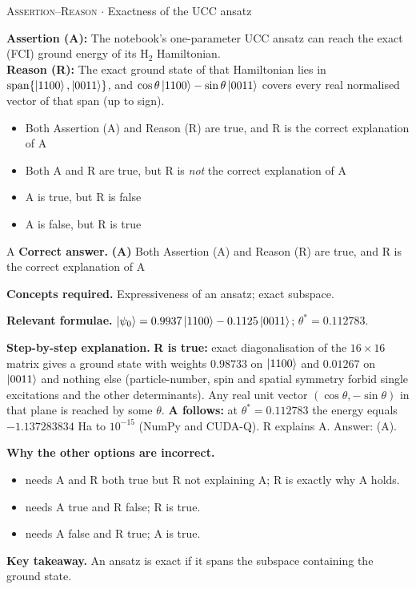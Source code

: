 \documentclass[11pt,a4paper]{article}
\newcommand{\optlabel}[1]{\textbf{(#1)}}
\newcommand{\correctlabel}[1]{\textcolor{okgreen}{\textbf{(#1)}\,\ding{51}}}
\newenvironment{qitem}[1]{\begin{list}{}{\setlength{\leftmargin}{3.3em}\setlength{\labelwidth}{3.1em}%
  \setlength{\labelsep}{0.2em}\setlength{\topsep}{3pt}\setlength{\parsep}{3pt}}\item[\textbf{Q.#1}\hfill]}{\end{list}}
\newcommand{\qsep}{\par\vspace{2pt}{\color{black!15}\hrule}\vspace{4pt}}
\newcommand{\qmeta}[2]{{\footnotesize\color{black!60}\textsc{#1} \;$\cdot$\; #2}\par}
\begin{document}
\begin{qitem}{49}
\qmeta{Assertion--Reason}{Exactness of the UCC ansatz}
\textbf{Assertion (A):} The notebook's one-parameter UCC ansatz can reach the exact (FCI) ground energy of its H$_2$ Hamiltonian.\\[1mm]
\textbf{Reason (R):} The exact ground state of that Hamiltonian lies in $\mathrm{span}\{\ket{1100}, \ket{0011}\}$, and $\cos\theta\ket{1100} - \sin\theta\ket{0011}$ covers every
real normalised vector of that span (up to sign).
\begin{itemize}[leftmargin=2.6em, labelsep=0.4em, itemsep=2pt, topsep=3pt]
\item[\correctlabel{A}] Both Assertion (A) and Reason (R) are true, and R is the correct explanation of A
\item[\optlabel{B}] Both A and R are true, but R is \emph{not} the correct explanation of A
\item[\optlabel{C}] A is true, but R is false
\item[\optlabel{D}] A is false, but R is true
\end{itemize}
\end{qitem}
\begin{solbox}{A}
\textbf{\color{brand}Correct answer.} \textcolor{okgreen}{\textbf{(A)}} Both Assertion (A) and Reason (R) are true, and R is the correct explanation of A

\textbf{\color{brand}Concepts required.} Expressiveness of an ansatz; exact subspace.

\textbf{\color{brand}Relevant formulae.} $\ket{\psi_0} = 0.9937\ket{1100} - 0.1125\ket{0011}$; $\theta^* = 0.112783$.

\textbf{\color{brand}Step-by-step explanation.} \textbf{R is true:} exact diagonalisation of the $16\times16$ matrix gives a ground state with weights $0.98733$ on $\ket{1100}$ and $0.01267$ on $\ket{0011}$
and nothing else (particle-number, spin and spatial symmetry forbid single excitations and the other determinants). Any real unit vector
$(\cos\theta, -\sin\theta)$ in that plane is reached by some $\theta$.
\textbf{A follows:} at $\theta^* = 0.112783$ the energy equals $-1.137283834$ Ha to $10^{-15}$ (NumPy and CUDA-Q). R explains A. Answer: (A).

\textbf{\color{brand}Why the other options are incorrect.}
\begin{itemize}[leftmargin=2.4em, itemsep=1pt, topsep=2pt]
\item[\textbf{(B)}] needs A and R both true but R not explaining A; R is exactly why A holds.
\item[\textbf{(C)}] needs A true and R false; R is true.
\item[\textbf{(D)}] needs A false and R true; A is true.
\end{itemize}
\textbf{\color{brand}Key takeaway.} An ansatz is exact if it spans the subspace containing the ground state.
\end{solbox}
\qsep
\end{document}
